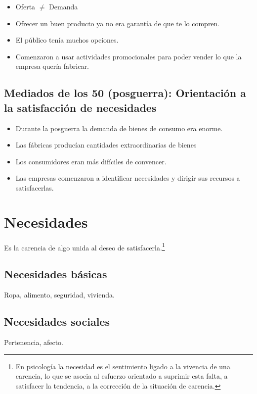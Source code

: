 \documentclass[10pt, spanish, a5paper]{article}
\begin{document}
\begin{itemize}
	\item Oferta $\neq$ Demanda
	\item Ofrecer un buen producto ya no era garantía de que te lo compren.
	\item El público tenía muchos opciones.
	\item Comenzaron a usar actividades promocionales para poder vender lo que la empresa quería fabricar.
\end{itemize}

\subsection{Mediados de los 50 (posguerra): Orientación a la satisfacción de necesidades}

\begin{itemize}
	\item Durante la posguerra la demanda de bienes de consumo era enorme.
	\item Las fábricas producían cantidades extraordinarias de bienes
	\item Los consumidores eran más difíciles de convencer.
	\item Las empresas comenzaron a identificar necesidades y dirigir sus recursos a satisfacerlas.
	
\end{itemize}



\section{Necesidades}

Es la carencia de algo unida al deseo de satisfacerla.\footnote{En psicología la necesidad es el sentimiento ligado a la vivencia de una carencia, lo que se asocia al esfuerzo orientado a suprimir esta falta, a satisfacer la tendencia, a la corrección de la situación de carencia.\cite{necesidad}}

\subsection{Necesidades básicas}

Ropa, alimento, seguridad, vivienda.

\subsection{Necesidades sociales}
Pertenencia, afecto.
\end{document}
